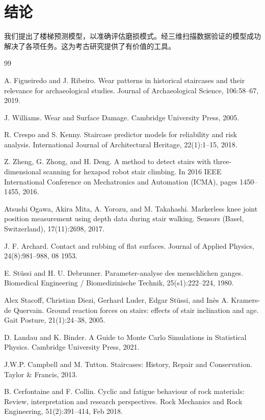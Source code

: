 \documentclass[11pt,a4paper]{ctexart}
\begin{document}
\section{结论}

我们提出了楼梯预测模型，以准确评估磨损模式。经三维扫描数据验证的模型成功解决了各项任务。这为考古研究提供了有价值的工具。

\begin{thebibliography}{99}
\small
\setlength{\itemsep}{0.1em}

 A. Figueiredo and J. Ribeiro. Wear patterns in historical staircases and their relevance for archaeological studies. Journal of Archaeological Science, 106:58--67, 2019.

 J. Williams. Wear and Surface Damage. Cambridge University Press, 2005.

 R. Crespo and S. Kenny. Staircase predictor models for reliability and risk analysis. International Journal of Architectural Heritage, 22(1):1--15, 2018.

 Z. Zheng, G. Zhong, and H. Deng. A method to detect stairs with three-dimensional scanning for hexapod robot stair climbing. In 2016 IEEE International Conference on Mechatronics and Automation (ICMA), pages 1450--1455, 2016.

 Atsushi Ogawa, Akira Mita, A. Yorozu, and M. Takahashi. Markerless knee joint position measurement using depth data during stair walking. Sensors (Basel, Switzerland), 17(11):2698, 2017.

 J. F. Archard. Contact and rubbing of flat surfaces. Journal of Applied Physics, 24(8):981--988, 08 1953.

 E. Stüssi and H. U. Debrunner. Parameter-analyse des menschlichen ganges. Biomedical Engineering / Biomedizinische Technik, 25(s1):222--224, 1980.

 Alex Stacoff, Christian Diezi, Gerhard Luder, Edgar Stüssi, and Inès A. Kramers-de Quervain. Ground reaction forces on stairs: effects of stair inclination and age. Gait Posture, 21(1):24--38, 2005.

 D. Landau and K. Binder. A Guide to Monte Carlo Simulations in Statistical Physics. Cambridge University Press, 2021.

 J.W.P. Campbell and M. Tutton. Staircases: History, Repair and Conservation. Taylor \& Francis, 2013.

 B. Cerfontaine and F. Collin. Cyclic and fatigue behaviour of rock materials: Review, interpretation and research perspectives. Rock Mechanics and Rock Engineering, 51(2):391--414, Feb 2018.

\end{thebibliography}
\end{document}

